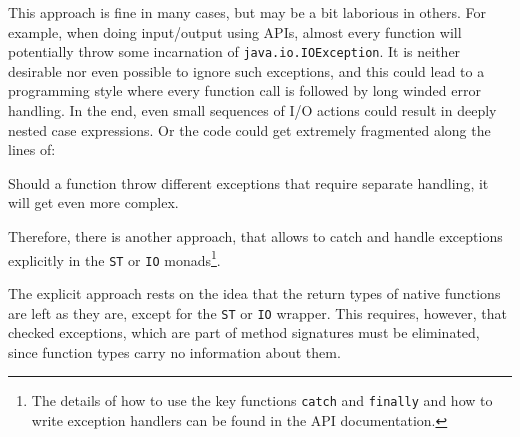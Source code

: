 This approach is fine in many cases, but may be a bit laborious in others. 
For example, when doing input/output using \java{} APIs, almost every function will potentially throw some incarnation of \texttt{java.io.IOException}. 
It is neither desirable nor even possible to ignore such exceptions, and this could lead to a programming style where every function call is followed by long winded error handling. In the end, even small sequences of I/O actions could result in deeply nested case expressions. Or the code could get extremely fragmented along the lines of:


Should a function throw different exceptions that require separate handling, it will get even more complex.

Therefore, there is another approach, that allows to catch and handle exceptions explicitly 
in the \texttt{ST} or \texttt{IO} monads\footnote{The details of how to use the key functions \texttt{catch} and \texttt{finally} and how to write exception handlers can be found in the API documentation.}.

The explicit approach rests on the idea that the return types of native functions are left as they are, 
except for the \texttt{ST} or \texttt{IO} wrapper.
This requires, however, that checked exceptions, 
which are part of \java{} method signatures must be eliminated,
since \frege{} function types carry no information about them.

